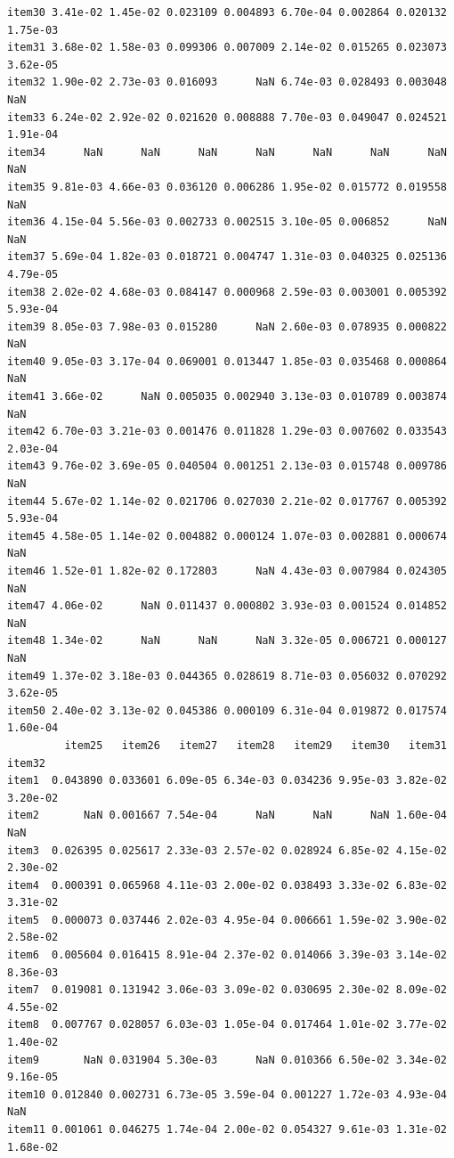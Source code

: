 \documentclass[
  a4paper,
]{ltjsbook}
\begin{document}
\begin{verbatim}
item30 3.41e-02 1.45e-02 0.023109 0.004893 6.70e-04 0.002864 0.020132 1.75e-03
item31 3.68e-02 1.58e-03 0.099306 0.007009 2.14e-02 0.015265 0.023073 3.62e-05
item32 1.90e-02 2.73e-03 0.016093      NaN 6.74e-03 0.028493 0.003048      NaN
item33 6.24e-02 2.92e-02 0.021620 0.008888 7.70e-03 0.049047 0.024521 1.91e-04
item34      NaN      NaN      NaN      NaN      NaN      NaN      NaN      NaN
item35 9.81e-03 4.66e-03 0.036120 0.006286 1.95e-02 0.015772 0.019558      NaN
item36 4.15e-04 5.56e-03 0.002733 0.002515 3.10e-05 0.006852      NaN      NaN
item37 5.69e-04 1.82e-03 0.018721 0.004747 1.31e-03 0.040325 0.025136 4.79e-05
item38 2.02e-02 4.68e-03 0.084147 0.000968 2.59e-03 0.003001 0.005392 5.93e-04
item39 8.05e-03 7.98e-03 0.015280      NaN 2.60e-03 0.078935 0.000822      NaN
item40 9.05e-03 3.17e-04 0.069001 0.013447 1.85e-03 0.035468 0.000864      NaN
item41 3.66e-02      NaN 0.005035 0.002940 3.13e-03 0.010789 0.003874      NaN
item42 6.70e-03 3.21e-03 0.001476 0.011828 1.29e-03 0.007602 0.033543 2.03e-04
item43 9.76e-02 3.69e-05 0.040504 0.001251 2.13e-03 0.015748 0.009786      NaN
item44 5.67e-02 1.14e-02 0.021706 0.027030 2.21e-02 0.017767 0.005392 5.93e-04
item45 4.58e-05 1.14e-02 0.004882 0.000124 1.07e-03 0.002881 0.000674      NaN
item46 1.52e-01 1.82e-02 0.172803      NaN 4.43e-03 0.007984 0.024305      NaN
item47 4.06e-02      NaN 0.011437 0.000802 3.93e-03 0.001524 0.014852      NaN
item48 1.34e-02      NaN      NaN      NaN 3.32e-05 0.006721 0.000127      NaN
item49 1.37e-02 3.18e-03 0.044365 0.028619 8.71e-03 0.056032 0.070292 3.62e-05
item50 2.40e-02 3.13e-02 0.045386 0.000109 6.31e-04 0.019872 0.017574 1.60e-04
         item25   item26   item27   item28   item29   item30   item31   item32
item1  0.043890 0.033601 6.09e-05 6.34e-03 0.034236 9.95e-03 3.82e-02 3.20e-02
item2       NaN 0.001667 7.54e-04      NaN      NaN      NaN 1.60e-04      NaN
item3  0.026395 0.025617 2.33e-03 2.57e-02 0.028924 6.85e-02 4.15e-02 2.30e-02
item4  0.000391 0.065968 4.11e-03 2.00e-02 0.038493 3.33e-02 6.83e-02 3.31e-02
item5  0.000073 0.037446 2.02e-03 4.95e-04 0.006661 1.59e-02 3.90e-02 2.58e-02
item6  0.005604 0.016415 8.91e-04 2.37e-02 0.014066 3.39e-03 3.14e-02 8.36e-03
item7  0.019081 0.131942 3.06e-03 3.09e-02 0.030695 2.30e-02 8.09e-02 4.55e-02
item8  0.007767 0.028057 6.03e-03 1.05e-04 0.017464 1.01e-02 3.77e-02 1.40e-02
item9       NaN 0.031904 5.30e-03      NaN 0.010366 6.50e-02 3.34e-02 9.16e-05
item10 0.012840 0.002731 6.73e-05 3.59e-04 0.001227 1.72e-03 4.93e-04      NaN
item11 0.001061 0.046275 1.74e-04 2.00e-02 0.054327 9.61e-03 1.31e-02 1.68e-02

\end{verbatim}
\end{document}
